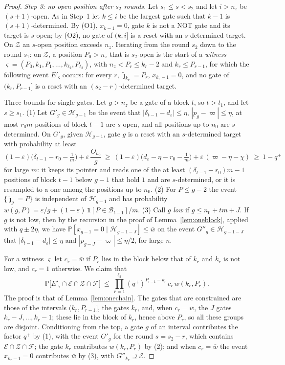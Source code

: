 \documentclass[11pt]{amsart}
\theoremstyle{definition}
\theoremstyle{remark}
\newcommand{\eps}{\varepsilon}
\newcommand{\jt}{\tilde{\jmath}}
\newcommand{\PP}{\mathbb{P}}
\begin{document}
\begin{proof}
\emph{Step 3: no open position after $s_2$ rounds.} Let $s_1\le s<s_2$ and let $i>n_z$ be
$(s+1)$-open. As in Step~1 let $k\le i$ be the largest gate such that $k-1$ is
$(s+1)$-determined. By (O1), $x_{k-1}=0$, gate $k$ is not a NOT gate and its target is $s$-open;
by (O2), no gate of $(k,i]$ is a reset with an $s$-determined target. On $\mathcal Z$ an $s$-open
position exceeds $n_z$. Iterating from the round $s_2$ down to the round $s_1$: on $\mathcal Z$,
a position $P_0>n_z$ that is $s_2$-open is the start of a \emph{witness}
$\varsigma=(P_0,k_1,P_1,\dots,k_{\ell_2},P_{\ell_2})$, with $n_z<P_r\le k_r-2$ and $k_r\le P_{r-1}$,
for which the following event $E'_\varsigma$ occurs: for every $r$, $\jt_{k_r}=P_r$, $x_{k_r-1}=0$,
and no gate of $(k_r,P_{r-1}]$ is a reset with an $(s_2-r)$-determined target.

Three bounds for single gates. Let $g>n_z$ be a gate of a block $t$, so $t>t_1$, and let
$s\ge s_1$. (1) Let $G'_g\in\mathcal H_{g-1}$ be the event that $|\delta_{t-1}-d_\eps|\le\eta$,
$|p_g-\varpi|\le\eta$, at most $r_0m$ positions of block $t-1$ are $s$-open, and all positions up
to $n_0$ are $s$-determined. On $G'_g$, given $\mathcal H_{g-1}$, gate $g$ is a reset with an
$s$-determined target with probability at least
\[
(1-\eps)\bigl(\delta_{t-1}-r_0-\tfrac1m\bigr)+\eps\,\frac{O_{n_0}}g\ \ge\
(1-\eps)\bigl(d_\eps-\eta-r_0-\tfrac1m\bigr)+\eps\,(\varpi-\eta-\chi)\ \ge\ 1-q^+
\]
for large $m$: it keeps its pointer and reads one of the at least $(\delta_{t-1}-r_0)m-1$
positions of block $t-1$ below $g-1$ that hold $1$ and are $s$-determined, or it is resampled to
a one among the positions up to $n_0$. (2) For $P\le g-2$ the event $\{\jt_g=P\}$ is independent
of $\mathcal H_{g-1}$ and has probability
$w(g,P)=\eps/g+(1-\eps)\,\mathbf 1[P\in\mathcal B_{t-1}]/m$. (3) Call $g$ \emph{low} if
$g\le n_0+tm+J$. If $g$ is not low, then by the recursion in the proof of
Lemma~\ref{lem:oneblock}, applied with $q\pm2\eta$, we have
$\PP[x_{g-1}=0\mid\mathcal H_{g-1-J}]\le\bar w$ on the event $G''_g\in\mathcal H_{g-1-J}$ that
$|\delta_{t-1}-d_\eps|\le\eta$ and $|p_{g-J}-\varpi|\le\eta/2$, for large $n$.

For a witness $\varsigma$ let $c_r=\bar w$ if $P_r$ lies in the block below that of $k_r$ and $k_r$
is not low, and $c_r=1$ otherwise. We claim that
\begin{equation}\label{eq:witness}
\PP\bigl[E'_\varsigma\cap\mathcal E\cap\mathcal Z\cap\mathcal F\bigr]\ \le\ \prod_{r=1}^{\ell_2}(q^+)^{P_{r-1}-k_r}\,c_r\,w(k_r,P_r).
\end{equation}
The proof is that of Lemma~\ref{lem:onechain}. The gates that are constrained are those of the
intervals $(k_r,P_{r-1}]$, the gates $k_r$, and, when $c_r=\bar w$, the $J$ gates
$k_r-J,\dots,k_r-1$; these lie in the block of $k_r$, hence above $P_r$, so all these groups are
disjoint. Conditioning from the top, a gate $g$ of an interval contributes the factor $q^+$ by
(1), with the event $G'_g$ for the round $s=s_2-r$, which contains
$\mathcal E\cap\mathcal Z\cap\mathcal F$; the gate $k_r$ contributes $w(k_r,P_r)$ by (2); and when
$c_r=\bar w$ the event $x_{k_r-1}=0$ contributes $\bar w$ by (3), with
$G''_{k_r}\supseteq\mathcal E$.


\end{proof}
\end{document}
